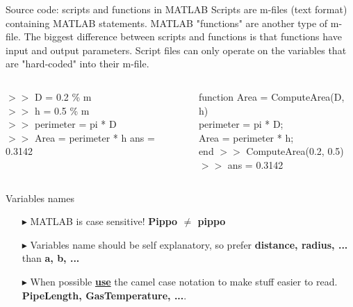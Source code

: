 \documentclass[xcolor={dvipsnames,rgb}, aspectratio=169]{beamer}
\begin{document}
\begin{frame}{Source code: scripts and functions in MATLAB}
Scripts are m-files (text format) containing MATLAB statements. MATLAB "functions" are
another type of m-file. The biggest difference between scripts and functions is that
functions have input and output parameters. Script files can only operate on the
variables that are "hard-coded" into their m-file.

\begin{columns}[T]%
   \begin{tcolorbox}[colback=white,colframe=bluepoli]
      $>>$ D = 0.2 \color{codegreen} \% m \color{black} \\
      $>>$ h = 0.5 \color{codegreen} \% m \color{black}\\
      $>>$ perimeter = pi * D\\
      $>>$ Area = perimeter * h
      \tcblower
      ans = 0.3142
   \end{tcolorbox}
   \begin{tcolorbox}[colback=white,colframe=bluepoli]
      \color{blue} function \color{black}
      Area = ComputeArea(D, h) \\
      perimeter = pi * D; \\
      Area = perimeter * h;\\
      \color{blue} end
      \tcblower
      $>>$ ComputeArea(0.2, 0.5) \\
      $>>$ ans = 0.3142
   \end{tcolorbox}
\end{columns}
\end{frame}

\begin{frame}{Variables names}
\begin{itemize}
   \item[$\blacktriangleright$] MATLAB is case sensitive! \textbf{Pippo $\neq$ pippo}
   \item[$\blacktriangleright$] Variables name should be self explanatory, so prefer
      \textbf{distance, radius, ...} than \textbf{a, b, ...}
   \item[$\blacktriangleright$] When possible \underline{\textbf{use}} the camel case
      notation to make stuff easier to read. \textbf{PipeLength, GasTemperature, ...}.
\end{itemize}
\end{frame}
\end{document}
